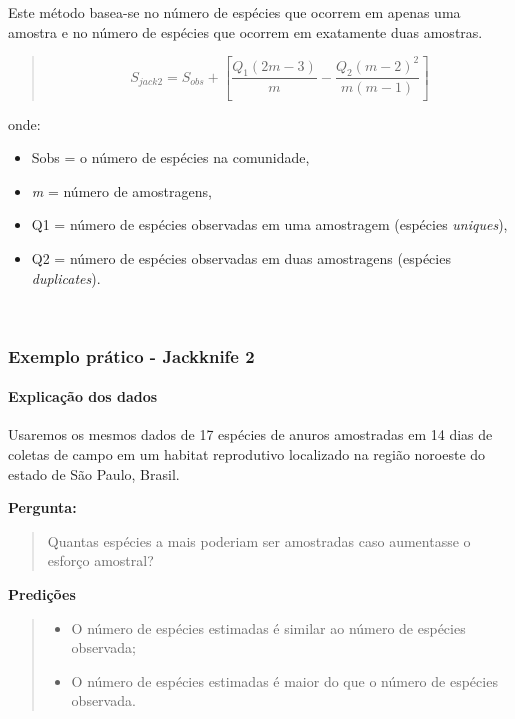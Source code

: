 \documentclass[
]{book}
\providecommand{\tightlist}{%
  \setlength{\itemsep}{0pt}\setlength{\parskip}{0pt}}
\begin{document}
Este método basea-se no número de espécies que ocorrem em apenas uma amostra e no número de espécies que ocorrem em exatamente duas amostras.

\begin{quote}
\[S_{jack2} = S_{obs} + \left[\frac{Q_1(2m - 3)}{m}-\frac{Q_2(m - 2)^2}{m(m-1)}\right]\]
\end{quote}

onde:

\begin{itemize}
\item
  Sobs = o número de espécies na comunidade,
\item
  \emph{m} = número de amostragens,
\item
  Q1 = número de espécies observadas em uma amostragem (espécies \emph{uniques}),
\item
  Q2 = número de espécies observadas em duas amostragens (espécies \emph{duplicates}).
\end{itemize}

~

\hypertarget{exemplo-pruxe1tico---jackknife-2}{%
\subsubsection{Exemplo prático - Jackknife 2}\label{exemplo-pruxe1tico---jackknife-2}}

\hypertarget{explicauxe7uxe3o-dos-dados-4}{%
\paragraph{Explicação dos dados}\label{explicauxe7uxe3o-dos-dados-4}}

Usaremos os mesmos dados de 17 espécies de anuros amostradas em 14 dias de coletas de campo em um habitat reprodutivo localizado na região noroeste do estado de São Paulo, Brasil.

\textbf{Pergunta:}

\begin{quote}
Quantas espécies a mais poderiam ser amostradas caso aumentasse o esforço amostral?
\end{quote}

\textbf{Predições}

\begin{quote}
\begin{itemize}
\tightlist
\item
  O número de espécies estimadas é similar ao número de espécies observada;
\item
  O número de espécies estimadas é maior do que o número de espécies observada.
\end{itemize}
\end{quote}
\end{document}
